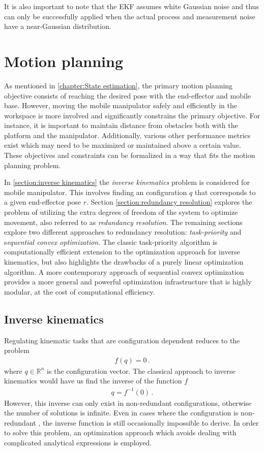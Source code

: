 \documentclass[times, utf8, diplomski, english]{fer}
\begin{document}
It is also important to note that the EKF assumes white Gaussian noise and thus can only be successfully applied when the actual process and measurement noise have a near-Gaussian distribution.


\chapter{Motion planning}\label{chapter:motion planning}
As mentioned in \autoref{chapter:State estimation}, the primary motion planning objective consists of reaching the desired pose with the end-effector and mobile base.
However, moving the mobile manipulator safely and efficiently in the workspace is more involved and significantly constrains the primary objective. 
For instance, it is important to maintain distance from obstacles both with the platform and the manipulator.
Additionally, various other performance metrics exist which may need to be maximized or maintained above a certain value.
These objectives and constraints can be formalized in a way that fits the motion planning problem.

In \autoref{section:inverse kinematics} the \textit{inverse kinematics} problem is considered for mobile manipulator.
This involves finding an configuration $q$ that corresponds to a given end-effector pose $r$.
Section \ref{section:redundancy resolution} explores the problem of utilizing the extra degrees of freedom of the system to optimize movement, also referred to as \textit{redundancy resolution}.
The remaining sections explore two different approaches to redundancy resolution: \textit{task-priority} and s\textit{equential convex optimization}. 
The classic task-priority algorithm is computationally efficient extension to the optimization approach for inverse kinematics, but also highlights the drawbacks of a purely linear optimization algorithm.
A more contemporary approach of sequential convex optimization provides a more general and powerful optimization infrastructure that is highly modular, at the cost of computational efficiency.
\section{Inverse kinematics}\label{section:inverse kinematics}
Regulating kinematic tasks that are configuration dependent reduces to the problem
\begin{align}
f\left(q\right) = 0 \, . %
\end{align}
where $q \in \mathbb{R}^{n} $  is the configuration vector. 
The classical approach to inverse kinematics would have us find the inverse of the function $f$
\begin{align}
q = f^{-1}\left(0\right)\, . \label{eq:inverse}
\end{align}
However, this inverse can only exist in non-redundant configurations, otherwise the number of solutions is infinite.
Even in cases where the configuration is non-redundant , the inverse function is still occasionally impossible to derive.
In order to solve this problem, an optimization approach which avoids dealing with complicated analytical expressions is employed.
\end{document}
